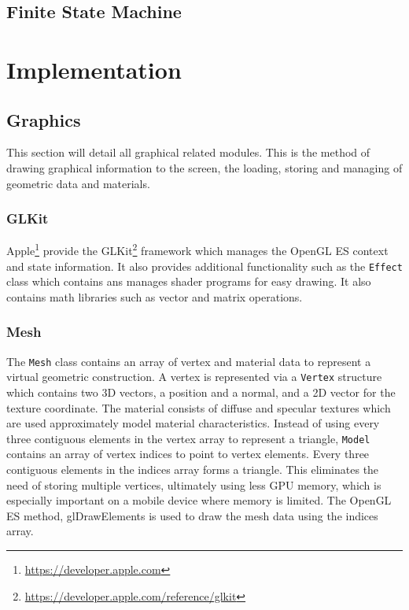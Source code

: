 \documentclass{cmppgr}
\begin{document}
\subsection{Finite State Machine}


\section{Implementation}

\subsection{Graphics}
This section will detail all graphical related modules. This is the method of drawing graphical information to the screen, the loading, storing and managing of geometric data and materials.

\subsubsection{GLKit}
Apple\footnote{\url{https://developer.apple.com}} provide the GLKit\footnote{\url{https://developer.apple.com/reference/glkit}} framework which manages the OpenGL ES context and state information. It also provides additional functionality such as the \texttt{Effect} class which contains ans manages shader programs for easy drawing. It also contains math libraries such as vector and matrix operations. 

\subsubsection{Mesh}
The \texttt{Mesh} class contains an array of vertex and material data to represent a virtual geometric construction. A vertex is represented via a \texttt{Vertex} structure which contains two 3D vectors, a position and a normal, and a 2D vector for the texture coordinate. The material consists of diffuse and specular textures which are used approximately model material characteristics. Instead of using every three contiguous elements in the vertex array to represent a triangle, \texttt{Model} contains an array of vertex indices to point to vertex elements. Every three contiguous elements in the indices array  forms a triangle. This eliminates the need of storing multiple vertices, ultimately using less GPU memory, which is especially important on a mobile device where memory is limited. The OpenGL ES method, glDrawElements is used to draw the mesh data using the indices array.
\end{document}

